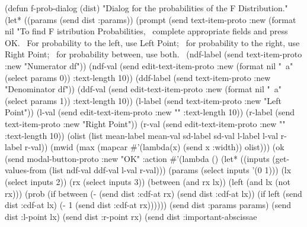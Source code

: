 \nwenddocs{}\plusendmoddef
(defun f-prob-dialog (dist)
  "Dialog for the probabilities of the F Distribution."
  (let* ((params (send dist :params))
         (prompt (send text-item-proto :new
                  (format nil 
                    "To find F istribution Probabilities,~%
                     complete appropriate fields and press OK.~%
                     For probability to the left, use Left Point;~%
                     for probability to the right, use Right Point;~%
                     for probability between, use both.~%
         (ndf-label (send text-item-proto :new "Numerator df"))
         (ndf-val (send edit-text-item-proto :new
                         (format nil "~a" (select params 0)) :text-length 10))
         (ddf-label (send text-item-proto :new "Denominator df"))
         (ddf-val (send edit-text-item-proto :new
                       (format nil "~a" (select params 1)) :text-length 10))
         (l-label (send text-item-proto :new "Left Point"))
         (l-val (send edit-text-item-proto :new "" :text-length 10))
         (r-label (send text-item-proto :new "Right Point"))
         (r-val (send edit-text-item-proto :new "" :text-length 10))
         (olist (list mean-label mean-val sd-label sd-val
                      l-label l-val r-label r-val))
         (mwid (max (mapcar #'(lambda(x) (send x :width)) olist)))
         (ok (send modal-button-proto :new "OK"
                   :action
                   #'(lambda ()
                      (let* ((inputs (get-values-from 
                                      (list ndf-val ddf-val l-val r-val)))
                             (params (select inputs '(0 1)))
                             (lx (select inputs 2))
                             (rx (select inputs 3))
                             (between (and rx lx))
                             (left (and lx (not rx)))
                             (prob (if between
                                      (- (send dist :cdf-at rx)
                                         (send dist :cdf-at lx))
                                     (if left
                                        (send dist :cdf-at lx)
                                       (- 1 (send dist :cdf-at rx))))))
                         (send dist :params params)
                         (send dist :l-point lx)
                         (send dist :r-point rx)
                         (send dist :important-abscissae
